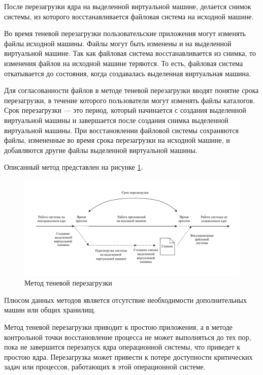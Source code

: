 После перезагрузки ядра на выделенной виртуальной машине, делается снимок системы, из которого восстанавливается файловая система на исходной машине.

Во время теневой перезагрузки пользовательские приложения могут изменять файлы исходной машины. Файлы могут быть изменены и на выделенной виртуальной машине. Так как файловая система восстанавливается из снимка, то изменения файлов на исходной машине теряются. То есть, файловая система откатывается до состояния, когда создавалась выделенная виртуальная машина.

Для согласованности файлов в методе теневой перезагрузки вводят понятие срока перезагрузки, в течение которого пользователи могут изменять файлы каталогов. Срок перезагрузки --- это период, который начинается с создания выделенной виртуальной машины \cite{vm} и завершается после создания снимка выделенной виртуальной машины. При восстановлении файловой системы сохраняются файлы, измененные во время срока перезагрузки на исходной машине, и добавляются другие файлы выделенной виртуальной машины. 

Описанный метод представлен на рисунке \ref{img:shadow-reboot}.

\begin{figure}[H]
	\begin{center}
		\includegraphics[scale=0.7]{img/shadow-reboot.pdf}
	\end{center}
	\captionsetup{justification=centering}
	\caption{Метод теневой перезагрузки}
	\label{img:shadow-reboot}
\end{figure}

Плюсом данных методов является отсутствие необходимости дополнительных машин или общих хранилищ.

Метод теневой перезагрузки приводит к простою приложения, а в методе контрольной точки восстановление процесса не может выполняться до тех пор, пока не завершится перезапуск ядра операционной системы, что приведет к простою ядра. Перезагрузка может привести к потере доступности критических задач или процессов, работающих в этой операционной системе.

